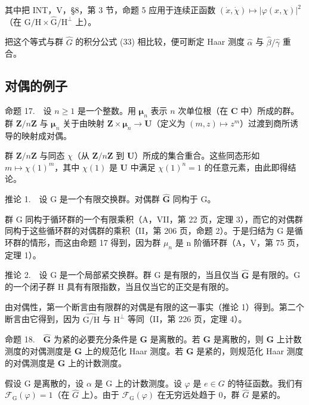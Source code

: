其中把 INT，V，§8，第 3 节，命题 5 应用于连续正函数 \((\dot{x},\dot{\chi})\mapsto |\varphi (x,\chi)|^{2}\)（在 \(\mathrm{G / H}\times \widehat{\mathrm{G}} /\mathrm{H}^{\perp}\) 上）。

把这个等式与群 \(\widehat{G}\) 的积分公式 (33) 相比较，便可断定 Haar 测度 \(\widehat{\alpha}\) 与 \(\widehat{\beta}/\widehat{\gamma}\) 重合。

\subsection{对偶的例子}

命题 17.　设 \(n \geqslant 1\) 是一个整数。用 \(\boldsymbol{\mu}_{n}\) 表示 \(n\) 次单位根（在 \(\mathbf{C}\) 中）所成的群。群 \(\mathbf{Z}/n\mathbf{Z}\) 与 \(\boldsymbol{\mu}_{n}\) 关于由映射 \(\mathbf{Z} \times \boldsymbol{\mu}_{n} \to \mathbf{U}\)（定义为 \((m,z) \mapsto z^{m}\)）过渡到商所诱导的映射成对偶。

群 \(\mathbf{Z}/n\mathbf{Z}\) 与同态 \(\chi\)（从 \(\mathbf{Z}/n\mathbf{Z}\) 到 \(\mathbf{U}\)）所成的集合重合。这些同态形如 \(m \mapsto \chi(1)^m\)，其中 \(\chi(1)\) 是 \(\mathbf{U}\) 中满足 \(\chi(1)^n = 1\) 的任意元素，由此即得结论。

推论 1.　设 G 是一个有限交换群。对偶群 \(\widehat{\mathbf{G}}\) 同构于 G。

群 G 同构于循环群的一个有限乘积（A，VII，第 22 页，定理 3），而它的对偶群同构于这些循环群的对偶群的乘积（II，第 206 页，命题 2）。于是归结为 G 是循环群的情形，而这由命题 17 得到，因为群 \(\mu_{n}\) 是 n 阶循环群（A，V，第 75 页，定理 1）。

推论 2.　设 G 是一个局部紧交换群。群 G 是有限的，当且仅当 \(\widehat{\mathbf{G}}\) 是有限的。G 的一个闭子群 H 具有有限指数，当且仅当它的正交是有限的。

由对偶性，第一个断言由有限群的对偶是有限的这一事实（推论 1）得到。第二个断言由它得到，因为 \(\widehat{\mathrm{G / H}}\) 与 \(\mathrm{H}^{\perp}\) 等同（II，第 226 页，定理 4）。

命题 18.　\(\widehat{\mathbf{G}}\) 为紧的必要充分条件是 \(\mathbf{G}\) 是离散的。若 \(\mathbf{G}\) 是离散的，则 \(\mathbf{G}\) 上计数测度的对偶测度是 \(\widehat{\mathbf{G}}\) 上的规范化 Haar 测度。若 \(\mathbf{G}\) 是紧的，则规范化 Haar 测度的对偶测度是 \(\widehat{\mathbf{G}}\) 上的计数测度。

假设 G 是离散的，设 \(\alpha\) 是 G 上的计数测度。设 \(\varphi\) 是 \(e \in G\) 的特征函数。我们有 \(\mathcal{F}_{\mathrm{G}}(\varphi) = 1\)（在 \(\widehat{G}\) 上）。由于 \(\mathcal{F}_{\mathrm{G}}(\varphi)\) 在无穷远处趋于 0，群 \(\widehat{G}\) 是紧的。

